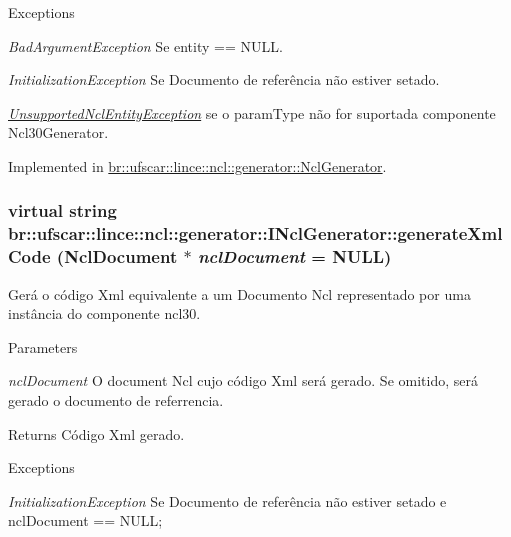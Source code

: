 \begin{DoxyExceptions}{Exceptions}
\item[{\em BadArgumentException}]Se entity == NULL. \item[{\em InitializationException}]Se Documento de referência não estiver setado. \item[{\em \hyperlink{classbr_1_1ufscar_1_1lince_1_1ncl_1_1generator_1_1UnsupportedNclEntityException}{UnsupportedNclEntityException}}]se o paramType não for suportada componente Ncl30Generator. \end{DoxyExceptions}


Implemented in \hyperlink{classbr_1_1ufscar_1_1lince_1_1ncl_1_1generator_1_1NclGenerator_a2306a011f81b11d0353644bf6bdf3e2b}{br::ufscar::lince::ncl::generator::NclGenerator}.

\hypertarget{classbr_1_1ufscar_1_1lince_1_1ncl_1_1generator_1_1INclGenerator_a396181e0d4b4d7e53addd5a25ffa839b}{
\subsubsection[{generateXmlCode}]{\setlength{\rightskip}{0pt plus 5cm}virtual string br::ufscar::lince::ncl::generator::INclGenerator::generateXmlCode (NclDocument $\ast$ {\em nclDocument} = {\ttfamily NULL})}}
\label{classbr_1_1ufscar_1_1lince_1_1ncl_1_1generator_1_1INclGenerator_a396181e0d4b4d7e53addd5a25ffa839b}


Gerá o código Xml equivalente a um Documento Ncl representado por uma instância do componente ncl30. 


\begin{DoxyParams}{Parameters}
\item[{\em nclDocument}]O document Ncl cujo código Xml será gerado. Se omitido, será gerado o documento de referrencia. \end{DoxyParams}
\begin{DoxyReturn}{Returns}
Código Xml gerado. 
\end{DoxyReturn}

\begin{DoxyExceptions}{Exceptions}
\item[{\em InitializationException}]Se Documento de referência não estiver setado e nclDocument == NULL; \end{DoxyExceptions}


